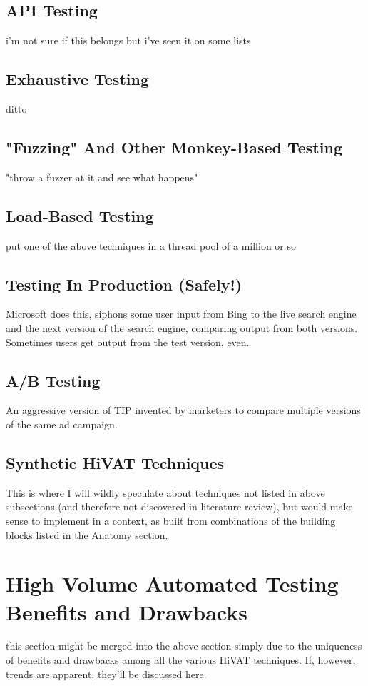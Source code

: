 \subsection{API Testing}
i'm not sure if this belongs but i've seen it on some lists %

\subsection{Exhaustive Testing}
ditto %

\subsection{"Fuzzing" And Other Monkey-Based Testing}
 "throw a fuzzer at it and see what happens" %

\subsection{Load-Based Testing}
put one of the above techniques in a thread pool of a million or so %

\subsection{Testing In Production (Safely!)}
Microsoft does this, siphons some user input from Bing to the live search engine and the next version of the search engine, comparing output from both versions. Sometimes users get output from the test version, even. %

\subsection{A/B Testing}
An aggressive version of TIP invented by marketers to compare multiple versions of the same ad campaign. %

\subsection{Synthetic HiVAT Techniques}
This is where I will wildly speculate about techniques not listed in above subsections (and therefore not discovered in literature review), but would make sense to implement in a context, as built from combinations of the building blocks listed in the Anatomy section. %

\section{High Volume Automated Testing Benefits and Drawbacks}
  this section might be merged into the above section simply due to the uniqueness of benefits and drawbacks among all the various HiVAT techniques. If, however, trends are apparent, they'll be discussed here. %

